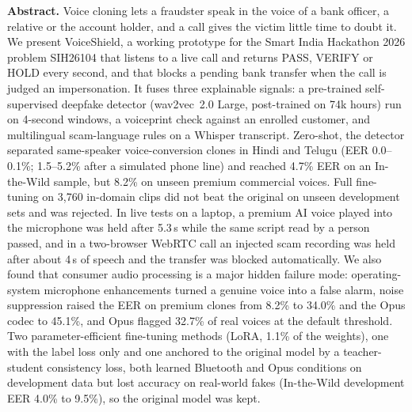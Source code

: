 \documentclass[10pt,a4paper,twocolumn]{article}
\begin{document}
\begin{minipage}{\textwidth}
\small
\noindent\textbf{Abstract.} Voice cloning lets a fraudster speak in the voice of a bank officer, a relative or the account holder, and a call gives the victim little time to doubt it.
We present VoiceShield, a working prototype for the Smart India Hackathon 2026 problem SIH26104 that listens to a live call and returns PASS, VERIFY or HOLD every second, and that blocks a pending bank transfer when the call is judged an impersonation.
It fuses three explainable signals: a pre-trained self-supervised deepfake detector (wav2vec~2.0 Large, post-trained on 74k hours) run on 4-second windows, a voiceprint check against an enrolled customer, and multilingual scam-language rules on a Whisper transcript.
Zero-shot, the detector separated same-speaker voice-conversion clones in Hindi and Telugu (EER 0.0--0.1\%; 1.5--5.2\% after a simulated phone line) and reached 4.7\% EER on an In-the-Wild sample, but 8.2\% on unseen premium commercial voices.
Full fine-tuning on 3,760 in-domain clips did not beat the original on unseen development sets and was rejected.
In live tests on a laptop, a premium AI voice played into the microphone was held after 5.3\,s while the same script read by a person passed, and in a two-browser WebRTC call an injected scam recording was held after about 4\,s of speech and the transfer was blocked automatically.
We also found that consumer audio processing is a major hidden failure mode: operating-system microphone enhancements turned a genuine voice into a false alarm, noise suppression raised the EER on premium clones from 8.2\% to 34.0\% and the Opus codec to 45.1\%, and Opus flagged 32.7\% of real voices at the default threshold.
Two parameter-efficient fine-tuning methods (LoRA, 1.1\% of the weights), one with the label loss only and one anchored to the original model by a teacher-student consistency loss, both learned Bluetooth and Opus conditions on development data but lost accuracy on real-world fakes (In-the-Wild development EER 4.0\% to 9.5\%), so the original model was kept.

\end{minipage}
\end{document}
